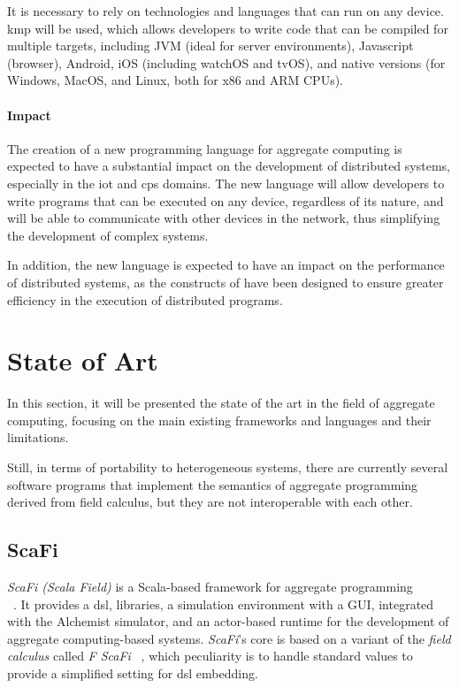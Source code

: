 It is necessary to rely on technologies and languages that can run on any device.
\ac{kmp} will be used, which allows developers to write code that can be compiled for multiple targets,
including JVM (ideal for server environments), Javascript (browser), Android, iOS (including watchOS and tvOS), and native versions
(for Windows, MacOS, and Linux, both for x86 and ARM CPUs).

\paragraph{Impact}
The creation of a new programming language for aggregate computing is expected to have a substantial impact on the
development of distributed systems, especially in the \ac{iot} and \ac{cps} domains.
The new language will allow developers to write programs that can be executed on any device, regardless of its nature,
and will be able to communicate with other devices in the network, thus simplifying the development of complex systems.

In addition, the new language is expected to have an impact on the performance of distributed systems, as the constructs
of \xc{} have been designed to ensure greater efficiency in the execution of distributed programs.

\section{State of Art}
\label{sec:state-of-art}

In this section, it will be presented the state of the art in the field of aggregate computing, focusing on the main existing
frameworks and languages and their limitations.

Still, in terms of portability to heterogeneous systems, there are currently several software programs that implement the
semantics of aggregate programming derived from field calculus, but they are not interoperable with each other.

\subsection{ScaFi}
\label{subsec:scafi}

\emph{ScaFi (Scala Field)} is a Scala-based framework for aggregate programming\\ ~\cite{CASADEI2022101248}.
It provides a \ac{dsl}, libraries, a simulation environment with a GUI, integrated with the
Alchemist simulator, and an actor-based runtime for the development of aggregate computing-based systems.
\emph{ScaFi}'s core is based on a variant of the \emph{field calculus} called \emph{F ScaFi} ~\cite{10.1007/978-3-030-61470-6_21},
which peculiarity is to handle standard values to provide a simplified setting for \ac{dsl} embedding.

